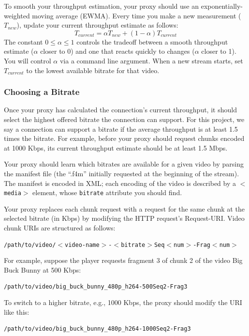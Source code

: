 \documentclass{article}
\begin{document}
To smooth your throughput estimation, your proxy should use an
exponentially-weighted moving average (EWMA). Every time you make a new
measurement ($T_{new}$), update your current throughput estimate as follows:
\begin{equation}
	T_{current} = \alpha T_{new}  +  (1 - \alpha)T_{current}
\label{eq:ewma}
\end{equation}
The constant $0 \leq \alpha \leq 1$ controls the tradeoff between a smooth
throughput estimate ($\alpha$ closer to 0) and one that reacts quickly to
changes ($\alpha$ closer to 1). You will control $\alpha$ via a command line
argument. When a new stream starts, set $T_{current}$ to the lowest available
bitrate for that video.



\subsubsection{Choosing a Bitrate}

Once your proxy has calculated the connection's current throughput, it should
select the highest offered bitrate the connection can support. For this
project, we say a connection can support a bitrate if the average throughput is
at least 1.5 times the bitrate. For example, before your proxy should request
chunks encoded at 1000 Kbps, its current throughput estimate should be at least
1.5 Mbps.

Your proxy should learn which bitrates are available for a given video by
parsing the manifest file (the ``.f4m'' initially requested at the beginning of
the stream). The manifest is encoded in XML; each encoding of the video is
described by a \texttt{$<$media$>$} element, whose \texttt{bitrate} attribute
you should find.

Your proxy replaces each chunk request with a request for the same chunk at the
selected bitrate (in Kbps) by modifying the HTTP request's Request-URI. Video
chunk URIs are structured as follows:
\begin{center}
	\texttt{/path/to/video/$<$video-name$>$-$<$bitrate$>$Seq$<$num$>$-Frag$<$num$>$}
\end{center}

For example, suppose the player requests fragment 3 of chunk 2 of the video Big
Buck Bunny at 500 Kbps:
\begin{center}
	\texttt{/path/to/video/big\_buck\_bunny\_480p\_h264-500Seq2-Frag3}
\end{center}
To switch to a higher bitrate, e.g., 1000 Kbps, the proxy should modify the URI
like this:
\begin{center}
	\texttt{/path/to/video/big\_buck\_bunny\_480p\_h264-1000Seq2-Frag3}
\end{center}
\end{document}
